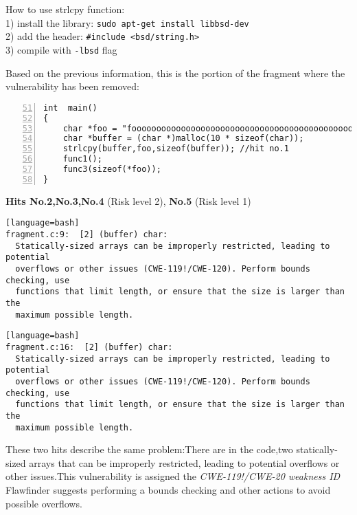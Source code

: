 \documentclass[a4paper,12pt]{article}
\newenvironment{SpecialPar}
  {\begin{shaded}}
  {\end{shaded}}
\begin{document}
\begin{SpecialPar}

\noindent
How to use strlcpy function:\\
 1) install the library: \texttt{sudo apt-get install libbsd-dev}\\
 2) add the header: \texttt{\#include <bsd/string.h>}\\
 3) compile with \texttt{-lbsd} flag\\
\end{SpecialPar}
\noindent
Based on the previous information, this is the portion of the fragment where the vulnerability has been removed:
\begin{lstlisting}[style=c,numbers=left,firstnumber=51,linebackgroundcolor={\ifnum\value{lstnumber}=55\color{green}\fi}]
int  main()
{
	char *foo = "fooooooooooooooooooooooooooooooooooooooooooooooooooo";
	char *buffer = (char *)malloc(10 * sizeof(char));
	strlcpy(buffer,foo,sizeof(buffer)); //hit no.1
	func1();
	func3(sizeof(*foo));
}
\end{lstlisting}

\break
\textbf{Hits No.2,No.3,No.4} (Risk level 2), \textbf{No.5} (Risk level 1)

\begin{lstlisting}[style=DOS][language=bash]
fragment.c:9:  [2] (buffer) char:
  Statically-sized arrays can be improperly restricted, leading to potential
  overflows or other issues (CWE-119!/CWE-120). Perform bounds checking, use
  functions that limit length, or ensure that the size is larger than the
  maximum possible length.
\end{lstlisting}

\begin{lstlisting}[style=DOS][language=bash]
fragment.c:16:  [2] (buffer) char:
  Statically-sized arrays can be improperly restricted, leading to potential
  overflows or other issues (CWE-119!/CWE-120). Perform bounds checking, use
  functions that limit length, or ensure that the size is larger than the
  maximum possible length.
\end{lstlisting}
These two hits describe the same problem:There are in the code,two statically-sized arrays that can be improperly restricted, leading to potential overflows or other issues.This vulnerability is assigned the \textit{CWE-119!/CWE-20 weakness ID}\cite{CWE}	\\
Flawfinder suggests performing a bounds checking and other actions to avoid possible overflows.
\end{document}
